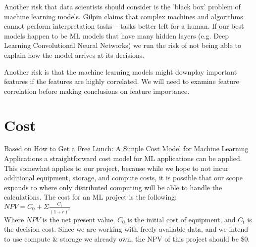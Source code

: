 \documentclass[sigconf,nonacm,11pt]{acmart}
\begin{document}
Another risk that data scientists should consider is the 'black box' problem of machine learning models. Gilpin claims that complex machines and algorithms cannot perform interpretation tasks \cite{gilpin}-- tasks better left for a human.  If our best models happen to be ML models that have many hidden layers (e.g. Deep Learning Convolutional Neural Networks) we run the risk of not being able to explain how the model arrives at its decisions.

Another risk is that the machine learning models might downplay important features if the features are highly correlated. We will need to examine feature correlation before making conclusions on feature importance.


\section{Cost}
Based on How to Get a Free Lunch: A Simple Cost Model for Machine Learning Applications a straightforward cost model for ML applications can be applied.  This somewhat applies to our project, because while we hope to not incur additional equipment, storage, and compute costs, it is possible that our scope expands to where only distributed computing will be able to handle the calculations.  The cost for an ML project is the following:\\

$NPV = C_0 + \Sigma{\frac{C_t}{(1+r)^t}}$\\

Where $NPV$ is the net present value, $C_0$ is the initial cost of equipment, and $C_t$ is the decision cost. Since we are working with freely available data, and we intend to use compute \& storage we already own, the NPV of this project should be \$0.
\end{document}
